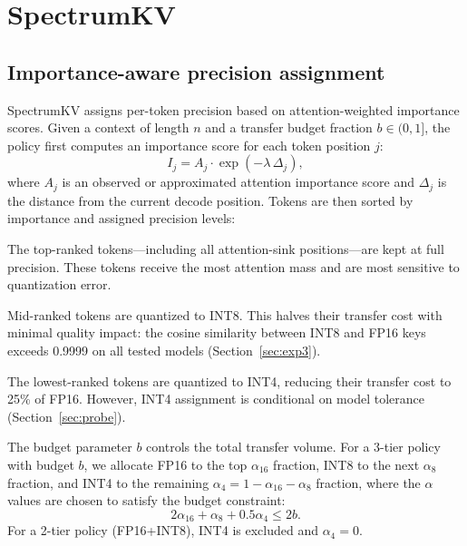 \documentclass[11pt]{article}
\newcommand{\method}{SpectrumKV}
\newcommand{\pct}{\%}
\theoremstyle{definition}
\theoremstyle{plain}
\begin{document}
\section{SpectrumKV}
\label{sec:method}

\subsection{Importance-aware precision assignment}
\label{sec:precision-assign}
\method{} assigns per-token precision based on attention-weighted importance scores.  Given a context of length $n$ and a transfer budget fraction $b \in (0,1]$, the policy first computes an importance score for each token position $j$:
\begin{equation}
  I_j = A_j \cdot \exp(-\lambda \, \Delta_j),
\end{equation}
where $A_j$ is an observed or approximated attention importance score and $\Delta_j$ is the distance from the current decode position.  Tokens are then sorted by importance and assigned precision levels:

\begin{description}[leftmargin=1.5em,itemsep=2pt]
  \item[FP16 (highest importance).] The top-ranked tokens---including all attention-sink positions---are kept at full precision.  These tokens receive the most attention mass and are most sensitive to quantization error.
  \item[INT8 (moderate importance).] Mid-ranked tokens are quantized to INT8.  This halves their transfer cost with minimal quality impact: the cosine similarity between INT8 and FP16 keys exceeds 0.9999 on all tested models (Section~\ref{sec:exp3}).
  \item[INT4 (lowest importance).] The lowest-ranked tokens are quantized to INT4, reducing their transfer cost to 25\pct{} of FP16.  However, INT4 assignment is conditional on model tolerance (Section~\ref{sec:probe}).
\end{description}

The budget parameter $b$ controls the total transfer volume.  For a 3-tier policy with budget $b$, we allocate FP16 to the top $\alpha_{16}$ fraction, INT8 to the next $\alpha_8$ fraction, and INT4 to the remaining $\alpha_4 = 1 - \alpha_{16} - \alpha_8$ fraction, where the $\alpha$ values are chosen to satisfy the budget constraint:
\begin{equation}
  2\alpha_{16} + \alpha_8 + 0.5\alpha_4 \le 2b.
\end{equation}
For a 2-tier policy (FP16+INT8), INT4 is excluded and $\alpha_4 = 0$.
\end{document}

